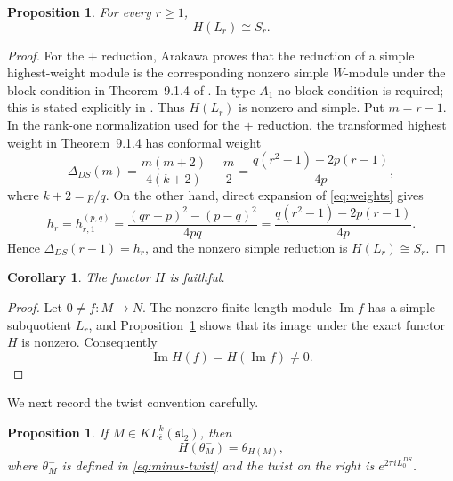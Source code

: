\documentclass[12pt,leqno]{amsart}
\numberwithin{equation}{section}
\newtheorem{prop}[thm]{Proposition}
\newtheorem{cor}[thm]{Corollary}
\newcommand{\KL}{KL}
\begin{document}
\begin{prop}\label{prop:H-simple}
For every $r\geq1$,
\[
 H(L_r)\cong S_r.
\]
\end{prop}

\begin{proof}
For the $+$ reduction, Arakawa proves that the reduction of a simple
highest-weight module is the corresponding nonzero simple $W$-module under
the block condition in Theorem~9.1.4 of \cite{ArakawaW}.  In type $A_1$ no
block condition is required; this is stated explicitly in
\cite[Remark~9.1.5(ii)]{ArakawaW}.  Thus $H(L_r)$ is nonzero and simple.
Put $m=r-1$.  In the rank-one normalization used for the $+$ reduction, the
transformed highest weight in Theorem~9.1.4 has conformal weight
\[
 \Delta_{DS}(m)
 =\frac{m(m+2)}{4(k+2)}-\frac m2
 =\frac{q(r^2-1)-2p(r-1)}{4p},
\]
where $k+2=p/q$.  On the other hand, direct expansion of
\eqref{eq:weights} gives
\[
 h_r=h_{r,1}^{(p,q)}
 =\frac{(qr-p)^2-(p-q)^2}{4pq}
 =\frac{q(r^2-1)-2p(r-1)}{4p}.
\]
Hence $\Delta_{DS}(r-1)=h_r$, and the nonzero simple reduction is
$H(L_r)\cong S_r$.
\end{proof}

\begin{cor}\label{cor:H-faithful}
The functor $H$ is faithful.
\end{cor}

\begin{proof}
Let $0\neq f:M\to N$.  The nonzero finite-length module $\operatorname{Im}f$
has a simple subquotient $L_r$, and Proposition~\ref{prop:H-simple} shows
that its image under the exact functor $H$ is nonzero.  Consequently
\[
 \operatorname{Im}H(f)=H(\operatorname{Im}f)\neq0.
\]
\end{proof}

We next record the twist convention carefully.

\begin{prop}\label{prop:H-twist}
If $M\in\KL^k_{\bar\epsilon}(\mathfrak{sl}_2)$, then
\[
 H(\theta^-_M)=\theta_{H(M)},
\]
where $\theta^-_M$ is defined in \eqref{eq:minus-twist} and the twist on the
right is $e^{2\pi iL^{DS}_0}$.
\end{prop}
\end{document}
